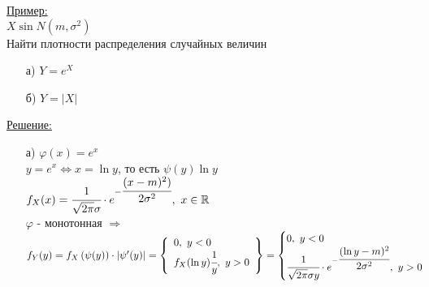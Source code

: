 \underline{Пример:}\\
$X \sin N(m, \sigma^2)$\\
Найти плотности распределения случайных величин\\
\begin{enumerate}
	\item[а)] $Y = e^{X}$
	\item[б)] $Y = |X|$
\end{enumerate}
\underline{Решение:}
\begin{enumerate}
	\item[а)] $\varphi(x) = e^x$\\
	$y = e^x \Leftrightarrow x = \ln{y}$, то есть $\psi(y) \ln{y}$\\
	$f_X(x) = \cfrac{1}{\sqrt{2 \pi} \sigma} \cdot e^{- \cfrac{(x - m)^2)}{2 \sigma^2}}, \ x \in \mathbb{R}$\\
	$\varphi$ - монотонная $\Rightarrow$\\
	$f_Y(y) = f_X \left(\psi(y)\right) \cdot |\psi'(y)| = \left\{
	\begin{array}{lll}
		0, \ y < 0\\
		f_X(\ln{y}) \cfrac{1}{y}, \ y > 0\\
	\end{array} \right\} = 
	\begin{cases}
		0, \ y < 0\\
		\cfrac{1}{\sqrt{2 \pi} \sigma y} \cdot e^{- \cfrac{(\ln{y} - m)^2}{2 \sigma^2}}, \ y > 0\\
	\end{cases}$\\
	

\end{enumerate}

